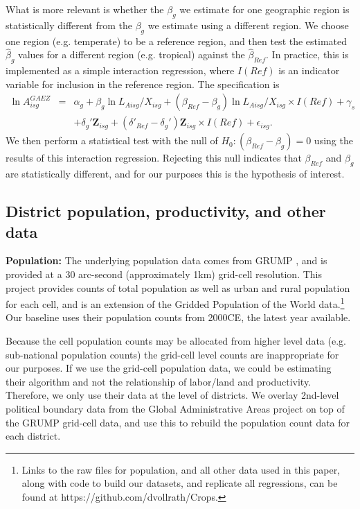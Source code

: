 \documentclass[12pt]{article}
\begin{document}
What is more relevant is whether the $\beta_g$ we estimate for one geographic region is statistically different from the $\beta_g$ we estimate using a different region. We choose one region (e.g. temperate) to be a reference region, and then test the estimated $\hat{\beta}_g$ values for a different region (e.g. tropical) against the $\hat{\beta}_{Ref}$. In practice, this is implemented as a simple interaction regression, where $I(Ref)$ is an indicator variable for inclusion in the reference region. The specification is
\begin{eqnarray}
    \ln A^{GAEZ}_{isg} &=& \alpha_g + \beta_g \ln L_{Aisg}/X_{isg} + (\beta_{Ref} - \beta_g) \ln L_{Aisg}/X_{isg} \times I(Ref) + \gamma_{s} \\ \nonumber
     && + \delta_g' \mathbf{Z}_{isg} + (\delta'_{Ref} - \delta_g') \mathbf{Z}_{isg} \times I(Ref) + \epsilon_{isg}. \label{EQ_interaction}
\end{eqnarray}
We then perform a statistical test with the null of $H_0: (\beta_{Ref} - \beta_g) = 0$ using the results of this interaction regression. Rejecting this null indicates that $\beta_{Ref}$ and $\beta_g$ are statistically different, and for our purposes this is the hypothesis of interest.

\subsection{District population, productivity, and other data}

\noindent\textbf{Population:} The underlying population data comes from GRUMP \citep{grump2011}, and is provided at a 30 arc-second (approximately 1km) grid-cell resolution. This project provides counts of total population as well as urban and rural population for each cell, and is an extension of the Gridded Population of the World data.\footnote{Links to the raw files for population, and all other data used in this paper, along with code to build our datasets, and replicate all regressions, can be found at https://github.com/dvollrath/Crops.} Our baseline uses their population counts from 2000CE, the latest year available.

Because the cell population counts may be allocated from higher level data (e.g. sub-national population counts) the grid-cell level counts are inappropriate for our purposes. If we use the grid-cell population data, we could be estimating their algorithm and not the relationship of labor/land and productivity. Therefore, we only use their data at the level of districts. We overlay 2nd-level political boundary data from the Global Administrative Areas project \citep{gadm} on top of the GRUMP grid-cell data, and use this to rebuild the population count data for each district.
\end{document}
